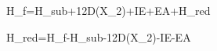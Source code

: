 \Delta H_f=\Delta H_{\rm sub}+\frac12D(X_2)+IE+EA+\Delta H_{\rm red}

\Delta H_{\rm red}=\Delta H_f-\Delta H_{\rm sub}-\frac12D(X_2)-IE-EA
